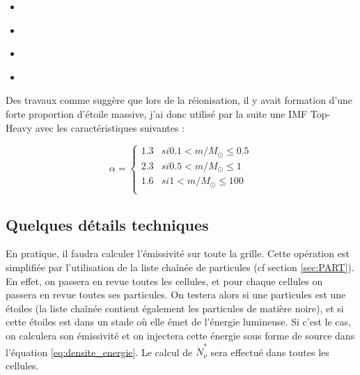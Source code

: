 \begin{itemize}
\item \cite{1955ApJ...121..161S}
\item \cite{1979ApJS...41..513M}
\item \cite{2001MNRAS.322..231K}
\item \cite{2003PASP..115..763C}
\end{itemize}



Des travaux comme \cite{2003MNRAS.344L...7C} suggère que lors de la réionisation, il y avait formation d'une forte proportion d'étoile massive, j'ai donc utilisé par la suite une \ac{IMF} Top-Heavy avec les caractéristiques suivantes :

\begin{equation}
	\alpha = 
  	\begin{cases}
	1.3 & si 0.1 < m/M_\odot \leq 0.5\\
	2.3 & si 0.5 < m/M_\odot \leq 1 \\
	1.6 & si 1   < m/M_\odot \leq 100 \\
	\end{cases}
\end{equation} 



\subsection{Quelques détails techniques}

En pratique, il faudra calculer l'émissivité sur toute la grille.
Cette opération est simplifiée par l'utilisation de la liste chaînée de particules (cf section \ref{sec:PART}).
En effet, on passera en revue toutes les cellules, et pour chaque cellules on passera en revue toutes ses particules.
On testera alors si une particules est une étoiles (la liste chaînée contient également les particules de matière noire), et si cette étoiles est dans un stade où elle émet de l'énergie lumineuse.
Si c'est le cas, on calculera son émissivité et on injectera cette énergie sous forme de source dans l'équation \ref{eq:densite_energie}.
Le calcul de $\dot{N}_\nu^*$ sera effectué dans toutes les cellules.








%
